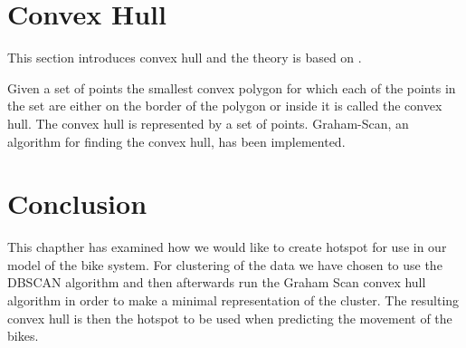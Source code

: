 \section{Convex Hull}\label{convex_hull}
This section introduces convex hull and the theory is based on \citet[section 33.3]{aadbook}.

Given a set of points the smallest convex polygon for which each of the points in the set are either on the border of the polygon or inside it is called the convex hull. \cite[33.1-5]{aadbook}
The convex hull is represented by a set of points.
Graham-Scan\cite[page 1031]{aadbook}, an algorithm for finding the convex hull, has been implemented.


\section{Conclusion}

This chapther has examined how we would like to create hotspot for use in our model of the bike system.
For clustering of the data we have chosen to use the DBSCAN algorithm and then afterwards run the Graham Scan convex hull algorithm in order to make a minimal representation of the cluster.
The resulting convex hull is then the hotspot to be used when predicting the movement of the bikes.
